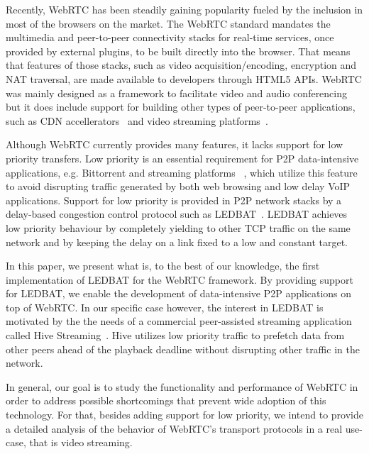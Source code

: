 \documentclass{sig-alternate}
\begin{document}

Recently, WebRTC has been steadily gaining popularity fueled by the inclusion in most of
the browsers on the market. The WebRTC standard mandates the multimedia and peer-to-peer
connectivity stacks for real-time services, once provided by external plugins, to be built
directly into the browser. That means that features of those stacks, such as video
acquisition/encoding, encryption and NAT traversal, are made available to developers
through HTML5 APIs. WebRTC was mainly designed as a framework to facilitate video and
audio conferencing but it does include support for building other types of peer-to-peer
applications, such as CDN accellerators~\cite{peerCDN} and video streaming
platforms~\cite{nurminen2013p2p}.

Although WebRTC currently provides many features, it lacks support for low priority
transfers. Low priority is an essential requirement for P2P data-intensive applications,
e.g. Bittorrent and streaming platforms ~\cite{smoothcache}, which utilize this feature to
avoid disrupting traffic generated by both web browsing and low delay VoIP applications.
Support for low priority is provided in P2P network stacks by a delay-based congestion
control protocol such as LEDBAT~\cite{ledbat}. LEDBAT achieves low priority behaviour by
completely yielding to other TCP traffic on the same network and by keeping the delay on a
link fixed to a low and constant target.

In this paper, we present what is, to the best of our knowledge, the first implementation
of LEDBAT for the WebRTC framework. By providing support for LEDBAT, we enable the
development of data-intensive P2P applications on top of WebRTC. In our specific case
however, the interest in LEDBAT is motivated by the the needs of a commercial
peer-assisted streaming application called Hive Streaming~\cite{hive}. Hive utilizes low
priority traffic to prefetch data from other peers ahead of the playback deadline without
disrupting other traffic in the network.

In general, our goal is to study the functionality and performance of WebRTC in order to
address possible shortcomings that prevent wide adoption of this technology. For that,
besides adding support for low priority, we intend to provide a detailed analysis of the
behavior of WebRTC's transport protocols in a real use-case, that is video streaming. 
\end{document}
